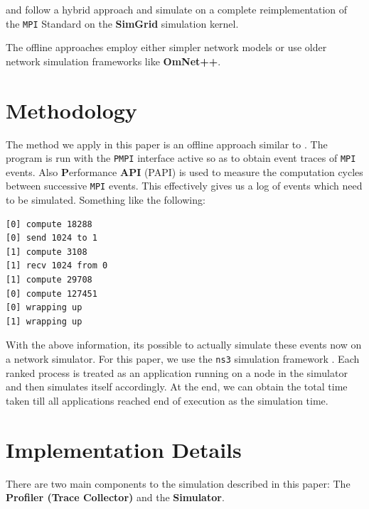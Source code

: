 \documentclass[10pt,conference]{IEEEtran}
\begin{document}
\cite{smpi} and \cite{smpi-online} follow a hybrid approach and simulate on a
complete reimplementation of the \texttt{MPI} Standard on the \textbf{SimGrid}
simulation kernel.

The offline approaches employ either simpler network models or use older network
simulation frameworks like \textbf{OmNet++}.

\section{Methodology}
The method we apply in this paper is an offline approach similar to
\cite{time-independent-trace-sim}. The program is run with the \texttt{PMPI}
interface active so as to obtain event traces of \texttt{MPI} events. Also
\textbf{P}erformance \textbf{API} (PAPI) is used to measure the computation
cycles between successive \texttt{MPI} events. This effectively gives us a log of events
which need to be simulated. Something like the following:
\begin{lstlisting}[frame=single]
[0] compute 18288
[0] send 1024 to 1
[1] compute 3108
[1] recv 1024 from 0
[1] compute 29708
[0] compute 127451
[0] wrapping up
[1] wrapping up
\end{lstlisting}

With the above information, its possible to actually simulate these events now
on a network simulator. For this paper, we use the \texttt{ns3} simulation
framework \cite{carneiro2010ns}. Each ranked process is treated as an
application running on a node in the simulator and then simulates itself
accordingly. At the end, we can obtain the total time taken till all
applications reached end of execution as the simulation time.

\section{Implementation Details}
There are two main components to the simulation described in this paper: The
\textbf{Profiler (Trace Collector)} and the \textbf{Simulator}.
\end{document}
